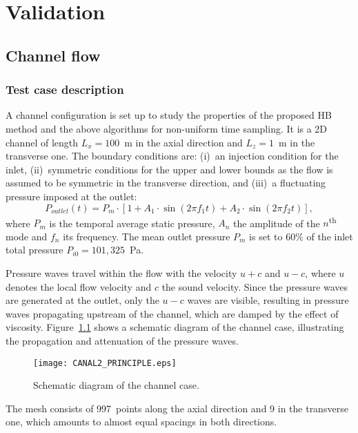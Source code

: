 \chapter{Validation} %
\label{cha:validation}

\section{Channel flow}
\label{sec:channel-flow}

\subsection{Test case description}
A channel configuration is set up to study the properties of the
proposed HB method and the above algorithms for non-uniform time
sampling.  It is a 2D channel of length $L_x = 100$~m in the axial
direction and $L_z = 1$~m in the transverse one.  The boundary
conditions are: (i)~an injection condition for the inlet,
(ii)~symmetric conditions for the upper and lower bounds as the flow
is assumed to be symmetric in the transverse direction, and (iii)~a
fluctuating pressure imposed at the outlet:
\begin{equation}
  P_{outlet}(t) = P_m \cdot \left[1 + A_1 \cdot \sin(2 \pi f_1 t) +
    A_2 \cdot \sin(2 \pi f_2 t) \right],
  \label{eq:outlet_canal}
\end{equation}
where $P_m$ is the temporal average static pressure, $A_n$ the
amplitude of the $n$\textsuperscript{th} mode and $f_n$ its
frequency. The mean outlet pressure $P_m$ is set to $60\%$ of the
inlet total pressure $P_{i0} = 101,325$~Pa.

Pressure waves travel within the flow with the velocity $u + c$ and $u
- c$, where $u$ denotes the local flow velocity and $c$ the sound
velocity. Since the pressure waves are generated at the outlet, only
the $u-c$ waves are visible, resulting in pressure waves propagating
upstream of the channel, which are damped by the effect of
viscosity. Figure~\ref{fig:canal_principle} shows a schematic diagram
of the channel case, illustrating the propagation and attenuation of
the pressure waves.
\begin{figure}[htb]
  \centering
  \texttt{[image: CANAL2\_PRINCIPLE.eps]}
  \caption{Schematic diagram of the channel case.}
  \label{fig:canal_principle}
\end{figure}

The mesh consists of 997~points along the axial direction and 9 in the
transverse one, which amounts to almost equal spacings in both
directions.


